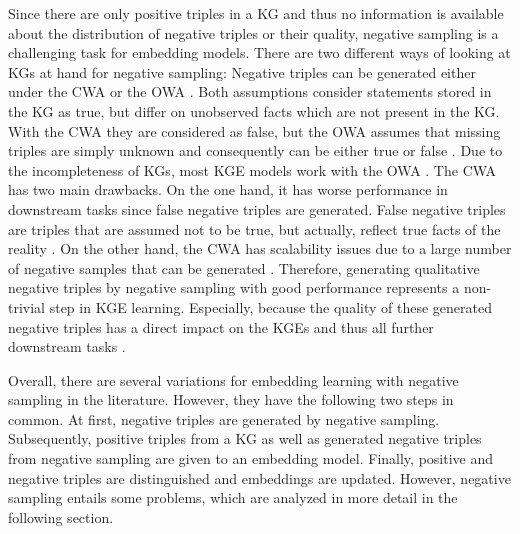 Since there are only positive triples in a \ac{KG} and thus no information is available about the distribution of negative triples or their quality, negative sampling is a challenging task for embedding models.
There are two different ways of looking at \acp{KG} at hand for negative sampling:
Negative triples can be generated either under the \ac{CWA} or the \ac{OWA} \cite{qiannegative}.
Both assumptions consider statements stored in the \ac{KG} as true, but differ on unobserved facts which are not present in the \ac{KG}.
With the \ac{CWA} they are considered as false, but the \ac{OWA} assumes that missing triples are simply unknown and consequently can be either true or false
\cite{qiannegative}.
Due to the incompleteness of \acp{KG}, most \ac{KGE} models 
work with the \ac{OWA} \cite{qiannegative}.
The \ac{CWA} has two main drawbacks.
On the one hand, it has worse performance in downstream tasks \cite{qiannegative} since false negative triples are generated.
False negative triples are triples that are assumed not to be true, but actually, reflect true facts of the reality \cite{qianunderstanding}.
On the other hand, the \ac{CWA} has scalability issues due to a large number of negative samples that can be generated \cite{qiannegative}.
Therefore, generating qualitative negative triples by negative sampling with good performance represents a non-trivial step in \ac{KGE} learning.
Especially, because the quality of these generated negative triples has a direct impact on the \acp{KGE} and thus all further downstream tasks \cite{qiannegative}.

Overall, there are several variations for embedding learning with negative sampling in the literature.
However, they have the following two steps in common.
At first, negative triples are generated by negative sampling.
Subsequently, positive triples from a \ac{KG} as well as generated negative triples from negative sampling are given to an embedding model.
Finally, positive and negative triples are distinguished and embeddings are updated.
However, negative sampling entails some problems, which are analyzed in more detail in the following section.
